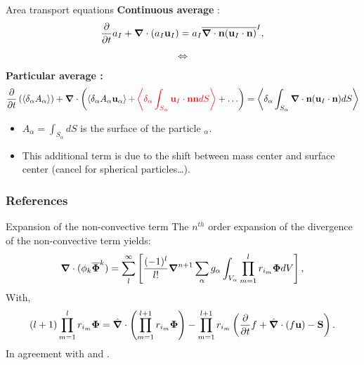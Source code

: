 \documentclass{sintefbeamer}
\newcommand{\nablab}{\bm{\nabla}}
\newcommand{\nablabh}{\hat{\bm{\nabla}}}
\begin{document}
\begin{frame}
  {Area transport equations}
  \textbf{Continuous average} :
  \begin{equation}
    \pddt a_I
    + \nablab \cdot \left(a_I \textbf{u}_I
    \right) 
    = a_I\Iavg{\nablab \cdot \textbf{n} (\textbf{u}_I \cdot \textbf{n})},
\end{equation}

  \begin{center}
    \begin{equation*}
      \Longleftrightarrow 
    \end{equation*}
  \end{center}
  \textbf{Particular average :}
  \begin{equation}
    \pddt   \left(\pavg{A_\alpha}\right)
    + \nablab \cdot \left(\pavg{A_\alpha \textbf{u}_\alpha} 
    \textcolor{red}{+ \pavg{\int_{S_\alpha} \textbf{u}_I \cdot \textbf{nn} dS}}
    +\ldots
    \right) 
    = \pavg{\int_{S_\alpha} \nablab \cdot \textbf{n} (\textbf{u}_I \cdot \textbf{n}) dS}
\end{equation}

\begin{itemize}
  \item $A_\alpha = \int_{S_\alpha} dS$ is the surface of the particle $_\alpha$.  
  \item This additional term is due to the shift between mass center and surface center (cancel for spherical particles\ldots). 
\end{itemize}

\end{frame}


\begin{frame}[t]
  \frametitle{References}
  
\end{frame}
\backmatter


\begin{frame}  {Expansion of the non-convective term}
  The $n^{th}$ order expansion of the divergence of the non-convective term yields:
  \begin{equation}
    \nablab\cdot
    (\phi_k \kavg{\bm{\Phi}})=
    \sum_l^\infty
    \left[
        \frac{(-1)^{l}}{l!}
        \nablab^{n+1}
        \sum_{\alpha}
        g_{\alpha}
        \int_{V_\alpha}
        \prod^{l}_{m=1}
        r_{i_m} \bm{\Phi}dV
    \right],
\end{equation}
With,
\begin{equation}
    (l+1) \prod^{l}_{m=1} r_{i_m} \bm{\Phi}
    =\nablabh \cdot \left(\prod^{l+1}_{m=1} r_{i_m} \bm{\Phi}\right)
    - \prod^{l+1}_{m=1} r_{i_m} \left(
        \pddt f 
        + \nablabh \cdot (f \textbf{u})
        - \textbf{S}
    \right).
\end{equation}
In agreement with \citet{nott2011suspension} and \citet{prosperetti2004average}.
\end{frame}
\end{document}
